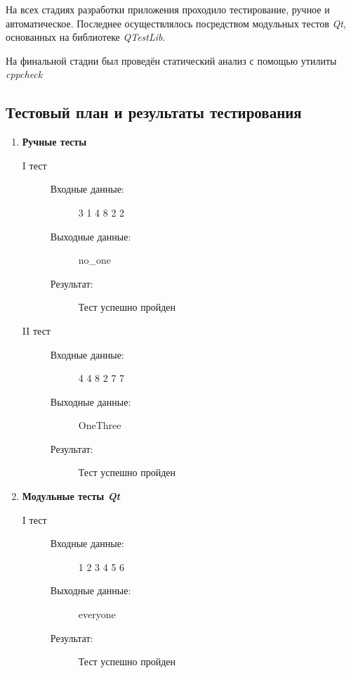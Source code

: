 \documentclass[12pt,a4paper]{report}
\begin{document}
На всех стадиях разработки приложения проходило тестирование, ручное и автоматическое. Последнее осуществлялось посредством модульных тестов \textit{Qt}, основанных на библиотеке  \textit{QTestLib}.

На финальной стадии был проведён статический анализ с помощью утилиты \textit{cppcheck}%
\subsection{Тестовый план и результаты тестирования}
\begin{enumerate}
\item \textbf{Ручные тесты}
\begin{description}
\item[I тест]
\hspace{\parindent}
\begin{flushleft}
\begin{description}
\item[Входные данные:] 3 1 4 8 2 2
\item[Выходные данные:] no\_one
\item[Результат:] Тест успешно пройден
\end{description}
\end{flushleft}
\end{description}

\begin{description}
\item[II тест]
\hspace{\parindent}
\begin{flushleft}
\begin{description}
\item[Входные данные:] 4 4 8 2 7 7
\item[Выходные данные:] OneThree
\item[Результат:] Тест успешно пройден
\end{description}
\end{flushleft}
\end{description}

\item \textbf{Модульные тесты \textit{Qt}}
\begin{description}
\item[I тест]
\hspace{\parindent}
\begin{flushleft}
\begin{description}
\item[Входные данные:] 1 2 3 4 5 6
\item[Выходные данные:] everyone
\item[Результат:] Тест успешно пройден
\end{description}
\end{flushleft}
\end{description}


\end{enumerate}
\end{document}
